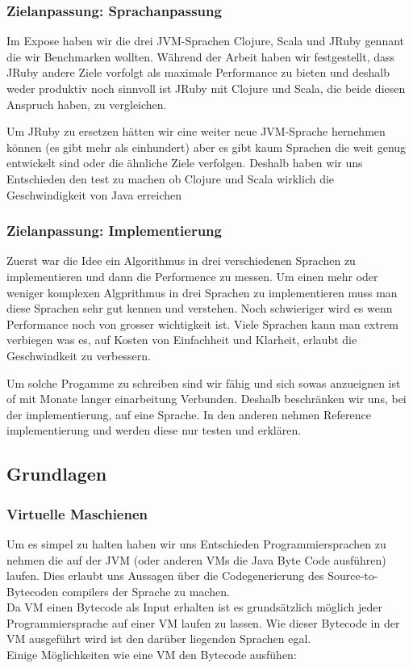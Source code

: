 \documentclass{fancydocument}
\begin{document}
\subsubsection{Zielanpassung: Sprachanpassung}

Im Expose haben wir die drei JVM-Sprachen Clojure, Scala und JRuby
gennant die wir Benchmarken wollten. W\"ahrend der Arbeit haben wir
festgestellt, dass JRuby andere Ziele vorfolgt als maximale
Performance zu bieten und deshalb weder produktiv noch sinnvoll ist
JRuby mit Clojure und Scala, die beide diesen Anspruch haben, zu
vergleichen.

Um JRuby zu ersetzen h\"atten wir eine weiter neue JVM-Sprache
hernehmen k\"onnen (es gibt mehr als einhundert) aber es gibt kaum
Sprachen die weit genug entwickelt sind oder die \"ahnliche Ziele
verfolgen. Deshalb haben wir uns Entschieden den test zu machen ob
Clojure und Scala wirklich die Geschwindigkeit von Java erreichen

\subsubsection{Zielanpassung: Implementierung}

Zuerst war die Idee ein Algorithmus in drei verschiedenen Sprachen zu
implementieren und dann die Performence zu messen. Um einen mehr oder
weniger komplexen Algprithmus in drei Sprachen zu implementieren muss
man diese Sprachen sehr gut kennen und verstehen. Noch schwieriger
wird es wenn Performance noch von grosser wichtigkeit ist. Viele
Sprachen kann man extrem verbiegen was es, auf Kosten von
Einfachheit und Klarheit, erlaubt die Geschwindkeit zu verbessern.

Um solche Progamme zu schreiben sind wir f\"ahig und sich sowas
anzueignen ist of mit Monate langer einarbeitung Verbunden. Deshalb
beschr\"anken wir uns, bei der implementierung, auf eine Sprache. In
den anderen nehmen Reference implementierung und werden diese nur
testen und erkl\"aren.

\subsection{Grundlagen}

\subsubsection{Virtuelle Maschienen}

Um es simpel zu halten haben wir uns Entschieden
Programmiersprachen zu nehmen die auf der JVM (oder anderen VMs die
Java Byte Code ausf\"uhren) laufen. Dies erlaubt uns Aussagen \"uber die
Codegenerierung des Source-to-Bytecoden compilers der Sprache zu
machen.
\\
Da VM einen Bytecode als Input erhalten ist es grunds\"atzlich m\"oglich
jeder Programmiersprache auf einer VM laufen zu lassen. Wie dieser
Bytecode in der VM ausgef\"uhrt wird ist den dar\"uber liegenden Sprachen
egal.\\ 
Einige M\"oglichkeiten wie eine VM den Bytecode ausf\"uhen:
\end{document}
